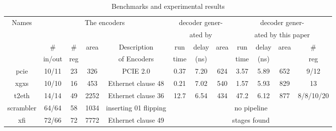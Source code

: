 \documentclass[twocolumn]{article}
\begin{document}
\begin{table}[t]
\caption{Benchmarks and experimental results}
\begin{tabular}{|c|c|c|c|c|c|c|c|c|c|c|c|}
\hline
 Names     & \multicolumn{4}{|c|}{The encoders}                                  &   \multicolumn{3}{|c|}{decoder gener-}             &   \multicolumn{4}{|c|}{decoder gener-} \\    
           & \multicolumn{4}{|c|}{}                                              &   \multicolumn{3}{|c|}{ated by \cite{ShenTCAD11}}  &   \multicolumn{4}{|c|}{ated by this paper} \\\cline{2-12}
           &    \#   &   \#    &area  & Description                             &run  &delay&area                                    &run  &delay&area&\#\\
           & in/out  &  reg    &      &   of Encoders                            &time &(ns) &                                        &time &(ns) &    &reg\\\hline\hline
 pcie      & 10/11   & 23      & 326  &PCIE 2.0 \cite{pcie21}                    &0.37 &7.20 &624                                     &3.57 & 5.89&652 &9/12\\\hline
 xgxs      & 10/10   & 16      & 453  &     Ethernet clause 48 \cite{IEEE8023_S4}&0.21 &7.02 &540                                     &1.57 & 5.93&829 &13\\\hline
 t2eth     & 14/14   & 49      & 2252 &    Ethernet clause 36 \cite{IEEE8023_S4} &12.7 &6.54 &434                                     &47.2 & 6.12&877 &8/8/10/20\\\hline
scrambler  &64/64    & 58      & 1034 & inserting 01 flipping                    &     \multicolumn{7}{|c|}{no pipeline }\\\cline{1-5}
 xfi       & 72/66   & 72      & 7772 &     Ethernet clause 49 \cite{IEEE8023_S4}&     \multicolumn{7}{|c|}{stages found}\\\hline
\end{tabular}\label{tab_bench}
\end{table}


%            
%            
\end{document}
